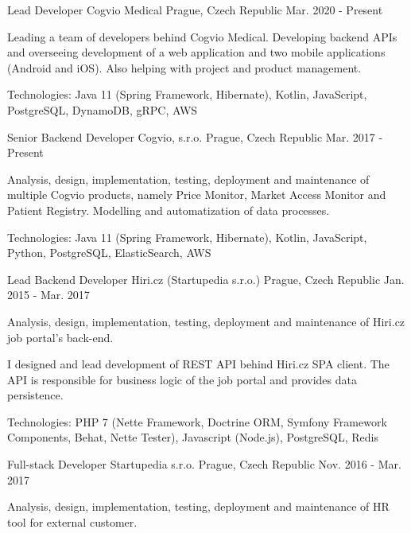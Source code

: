 \begin{cventries}
  \cventry
    {Lead Developer}
    {Cogvio Medical}
    {Prague, Czech Republic}
    {Mar. 2020 - Present}
    {
    \begin{cvitems}
      \item {Leading a team of developers behind Cogvio Medical. Developing backend APIs and overseeing development of a web application and two mobile applications (Android and iOS). Also helping with project and product management.}
      \item {Technologies: Java 11 (Spring Framework, Hibernate), Kotlin, JavaScript, PostgreSQL, DynamoDB, gRPC, AWS}
    \end{cvitems}
  }
  \cventry
    {Senior Backend Developer}
    {Cogvio, s.r.o.}
    {Prague, Czech Republic}
    {Mar. 2017 - Present}
    {
    \begin{cvitems}
      \item {Analysis, design, implementation, testing, deployment and maintenance of multiple Cogvio products, namely Price Monitor, Market Access Monitor and Patient Registry. Modelling and automatization of data processes.}
      \item {Technologies: Java 11 (Spring Framework, Hibernate), Kotlin, JavaScript, Python, PostgreSQL, ElasticSearch, AWS}
    \end{cvitems}
  }
  \cventry
    {Lead Backend Developer}
    {Hiri.cz (Startupedia s.r.o.)}
    {Prague, Czech Republic}
    {Jan. 2015 - Mar. 2017}
    {
      \begin{cvitems}
        \item {Analysis, design, implementation, testing, deployment and maintenance of Hiri.cz job portal's back-end.}
        \item {I designed and lead development of REST API behind Hiri.cz SPA client. The API is responsible for business logic of the job portal and provides data persistence.}
        \item {Technologies: PHP 7 (Nette Framework, Doctrine ORM, Symfony Framework Components, Behat, Nette Tester), Javascript (Node.js), PostgreSQL, Redis}
      \end{cvitems}
    }
  \cventry
    {Full-stack Developer}
    {Startupedia s.r.o.}
    {Prague, Czech Republic}
    {Nov. 2016 - Mar. 2017}
    {
      \begin{cvitems}
        \item {Analysis, design, implementation, testing, deployment and maintenance of HR tool for external customer.}

\end{cvitems}}
\end{cventries}
